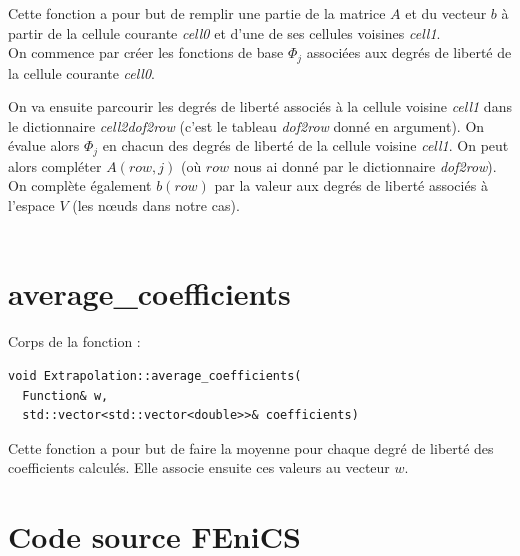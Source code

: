 \documentclass[french]{article}
\begin{document}
	Cette fonction a pour but de remplir une partie de la matrice $A$ et du vecteur $b$ à partir de la cellule courante \textit{cell0} et d'une de ses cellules voisines \textit{cell1}. \\

	On commence par créer les fonctions de base $\Phi_j$ associées aux degrés de liberté de la cellule courante \textit{cell0}.
	
	On va ensuite parcourir les degrés de liberté associés à la cellule voisine \textit{cell1} dans le dictionnaire \textit{cell2dof2row} (c'est le tableau \textit{dof2row} donné en argument). On évalue alors $\Phi_j$ en chacun des degrés de liberté de la cellule voisine \textit{cell1}. On peut alors compléter $A(row,j)$ (où $row$ nous ai donné par le dictionnaire \textit{dof2row}). On complète également $b(row)$ par la valeur aux degrés de liberté associés à l'espace $V$ (les nœuds dans notre cas). \\
	
	 \\
	
	\section{average\_coefficients}
	\label{average_coefficients}
	
	Corps de la fonction :
	
	\begin{lstlisting}
void Extrapolation::average_coefficients(
  Function& w,
  std::vector<std::vector<double>>& coefficients)	
	\end{lstlisting}

	Cette fonction a pour but de faire la moyenne pour chaque degré de liberté des coefficients calculés. Elle associe ensuite ces valeurs au vecteur $w$.

	\newpage
	\appendix
	
	\section{Code source FEniCS}
	
	
	
\end{document}
